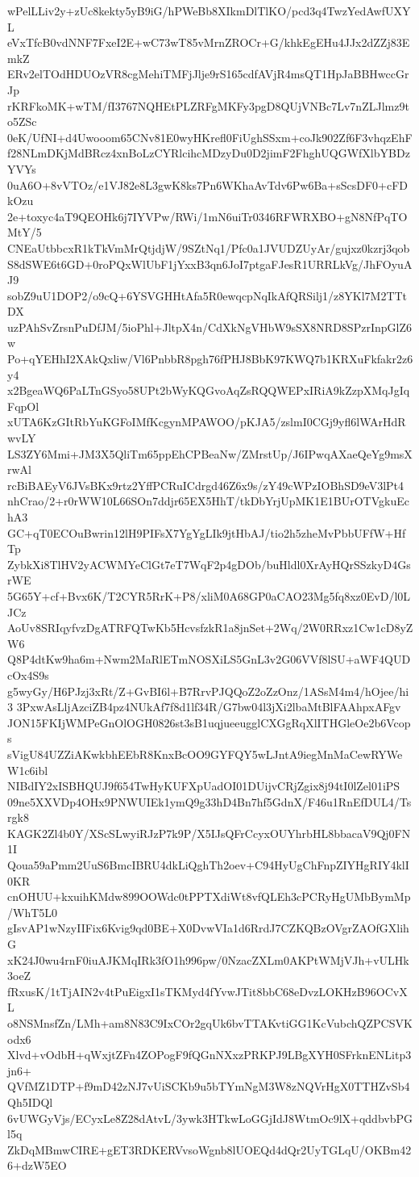 wPelLLiv2y+zUc8kekty5yB9iG/hPWeBb8XIkmDlTlKO/pcd3q4TwzYedAwfUXYL
eVxTfcB0vdNNF7FxeI2E+wC73wT85vMrnZROCr+G/khkEgEHu4JJx2dZZj83EmkZ
ERv2elTOdHDUOzVR8cgMehiTMFjJlje9rS165cdfAVjR4msQT1HpJaBBHwccGrJp
rKRFkoMK+wTM/fI3767NQHEtPLZRFgMKFy3pgD8QUjVNBc7Lv7nZLJlmz9to5ZSc
0eK/UfNI+d4Uwooom65CNv81E0wyHKrefl0FiUghSSxm+coJk902Zf6F3vhqzEhF
f28NLmDKjMdBRcz4xnBoLzCYRlcihcMDzyDu0D2jimF2FhghUQGWfXlbYBDzYVYs
0uA6O+8vVTOz/e1VJ82e8L3gwK8ks7Pn6WKhaAvTdv6Pw6Ba+sScsDF0+cFDkOzu
2e+toxyc4aT9QEOHk6j7IYVPw/RWi/1mN6uiTr0346RFWRXBO+gN8NfPqTOMtY/5
CNEaUtbbcxR1kTkVmMrQtjdjW/9SZtNq1/Pfc0a1JVUDZUyAr/gujxz0kzrj3qob
S8dSWE6t6GD+0roPQxWlUbF1jYxxB3qn6JoI7ptgaFJesR1URRLkVg/JhFOyuAJ9
sobZ9uU1DOP2/o9cQ+6YSVGHHtAfa5R0ewqcpNqIkAfQRSilj1/z8YKl7M2TTtDX
uzPAhSvZrsnPuDfJM/5ioPhl+JltpX4n/CdXkNgVHbW9sSX8NRD8SPzrInpGlZ6w
Po+qYEHhI2XAkQxliw/Vl6PnbbR8pgh76fPHJ8BbK97KWQ7b1KRXuFkfakr2z6y4
x2BgeaWQ6PaLTnGSyo58UPt2bWyKQGvoAqZsRQQWEPxIRiA9kZzpXMqJgIqFqpOl
xUTA6KzGItRbYuKGFoIMfKcgynMPAWOO/pKJA5/zslmI0CGj9yfl6lWArHdRwvLY
LS3ZY6Mmi+JM3X5QliTm65ppEhCPBeaNw/ZMrstUp/J6IPwqAXaeQeYg9msXrwAl
rcBiBAEyV6JVsBKx9rtz2YffPCRuICdrgd46Z6x9s/zY49cWPzIOBhSD9eV3lPt4
nhCrao/2+r0rWW10L66SOn7ddjr65EX5HhT/tkDbYrjUpMK1E1BUrOTVgkuEchA3
GC+qT0ECOuBwrin12lH9PIFsX7YgYgLIk9jtHbAJ/tio2h5zheMvPbbUFfW+HfTp
ZybkXi8TlHV2yACWMYeClGt7eT7WqF2p4gDOb/buHldl0XrAyHQrSSzkyD4GsrWE
5G65Y+cf+Bvx6K/T2CYR5RrK+P8/xliM0A68GP0aCAO23Mg5fq8xz0EvD/l0LJCz
AoUv8SRIqyfvzDgATRFQTwKb5HcvsfzkR1a8jnSet+2Wq/2W0RRxz1Cw1cD8yZW6
Q8P4dtKw9ha6m+Nwm2MaRlETmNOSXiLS5GnL3v2G06VVf8lSU+aWF4QUDcOx4S9s
g5wyGy/H6PJzj3xRt/Z+GvBI6l+B7RrvPJQQoZ2oZzOnz/1ASsM4m4/hOjee/hi3
3PxwAsLljAzciZB4pz4NUkAf7f8d1lf34R/G7bw04l3jXi2lbaMtBlFAAhpxAFgv
JON15FKIjWMPeGnOlOGH0826st3sB1uqjueeugglCXGgRqXlITHGleOe2b6Vcops
sVigU84UZZiAKwkbhEEbR8KnxBcOO9GYFQY5wLJntA9iegMnMaCewRYWeW1c6ibl
NIBdIY2xISBHQUJ9f654TwHyKUFXpUadOI01DUijvCRjZgix8j94tI0lZel01iPS
09ne5XXVDp4OHx9PNWUIEk1ymQ9g33hD4Bn7hf5GdnX/F46u1RnEfDUL4/Tsrgk8
KAGK2Zl4b0Y/XScSLwyiRJzP7k9P/X5IJsQFrCcyxOUYhrbHL8bbacaV9Qj0FN1I
Qoua59aPmm2UuS6BmcIBRU4dkLiQghTh2oev+C94HyUgChFnpZIYHgRIY4klI0KR
cnOHUU+kxuihKMdw899OOWdc0tPPTXdiWt8vfQLEh3cPCRyHgUMbBymMp/WhT5L0
gIsvAP1wNzyIIFix6Kvig9qd0BE+X0DvwVIa1d6RrdJ7CZKQBzOVgrZAOfGXlihG
xK24J0wu4rnF0iuAJKMqIRk3fO1h996pw/0NzacZXLm0AKPtWMjVJh+vULHk3oeZ
fRxusK/1tTjAIN2v4tPuEigxI1sTKMyd4fYvwJTit8bbC68eDvzLOKHzB96OCvXL
o8NSMnsfZn/LMh+am8N83C9IxCOr2gqUk6bvTTAKvtiGG1KcVubchQZPCSVKodx6
Xlvd+vOdbH+qWxjtZFn4ZOPogF9fQGnNXxzPRKPJ9LBgXYH0SFrknENLitp3jn6+
QVfMZ1DTP+f9mD42zNJ7vUiSCKb9u5bTYmNgM3W8zNQVrHgX0TTHZvSb4Qh5IDQl
6vUWGyVjs/ECyxLe8Z28dAtvL/3ywk3HTkwLoGGjIdJ8WtmOc9lX+qddbvbPGl5q
ZkDqMBmwCIRE+gET3RDKERVvsoWgnb8lUOEQd4dQr2UyTGLqU/OKBm426+dzW5EO
